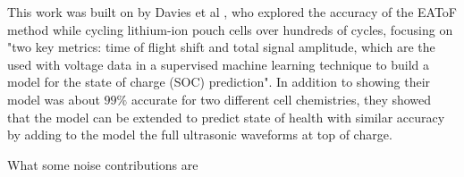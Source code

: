 This work was built on by Davies et al  \cite{SOC-SOH-EST}, who explored the accuracy of the EAToF method while cycling lithium-ion pouch cells over hundreds of cycles, focusing on "two key metrics: time of flight shift and total signal amplitude, which are the used with voltage data in a supervised machine learning technique to build a model for the state of charge (SOC) prediction". 
In addition to showing their model was about $99\%$ accurate for two different cell chemistries, they showed that the model can be extended to predict state of health with similar accuracy by adding to the model the full ultrasonic waveforms at top of charge.

What some noise contributions are